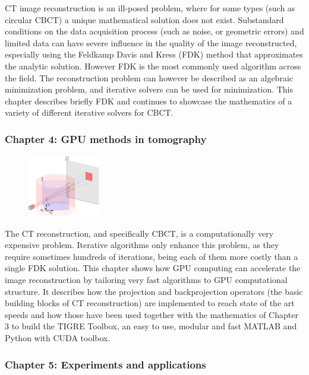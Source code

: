 CT image reconstruction is an ill-posed problem, where for some types (such as circular CBCT) a unique mathematical solution does not exist. Substandard conditions on the data acquisition process (such as noise, or geometric errors) and limited data can have severe influence in the quality of the image reconstructed, especially using the Feldkamp Davis and Kress (FDK) method that approximates the analytic solution. However FDK is the most commonly used algorithm across the field. The reconstruction problem can however be described as an algebraic minimization problem, and iterative solvers can be used for minimization. This chapter describes briefly FDK and continues to showcase the mathematics of a variety of different iterative solvers for CBCT.
\FloatBarrier
\subsubsection{Chapter 4: GPU methods in tomography}



\begin{figure}
\centering
\includegraphics[width=0.28\textwidth]{GPUmethods/projcoord-figure0.pdf}
\end{figure}

The CT reconstruction, and specifically CBCT, is a computationally very expensive problem. Iterative algorithms only enhance this problem, as they require sometimes hundreds of iterations, being each of them more costly than a single FDK solution. This chapter shows how GPU computing can accelerate the image reconstruction by tailoring very fast algorithms to GPU computational structure. It describes how the projection and backprojection operators (the basic building blocks of CT reconstruction) are implemented to reach state of the art speeds and how those have been used together with the mathematics of Chapter 3 to build the TIGRE Toolbox, an easy to use, modular and fast MATLAB and Python with CUDA toolbox.
\FloatBarrier
\subsubsection{Chapter 5: Experiments and applications}

